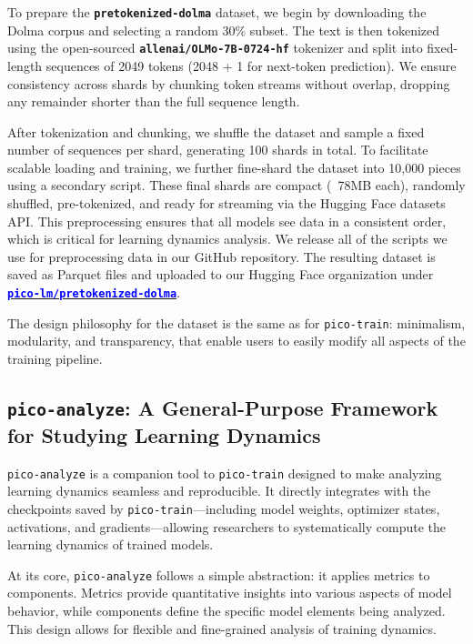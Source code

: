 To prepare the \textbf{\texttt{pretokenized-dolma}} dataset, we begin by downloading the Dolma corpus and selecting a random 30\% subset. The text is then tokenized using the open-sourced \textbf{\texttt{allenai/OLMo-7B-0724-hf}} tokenizer and split into fixed-length sequences of 2049 tokens (2048 + 1 for next-token prediction). We ensure consistency across shards by chunking token streams without overlap, dropping any remainder shorter than the full sequence length.

After tokenization and chunking, we shuffle the dataset and sample a fixed number of sequences per shard, generating 100 shards in total. To facilitate scalable loading and training, we further fine-shard the dataset into 10,000 pieces using a secondary script. These final shards are compact (~78MB each), randomly shuffled, pre-tokenized, and ready for streaming via the Hugging Face datasets API. This preprocessing ensures that all models see data in a consistent order, which is critical for learning dynamics analysis. We release all of the scripts we use for preprocessing data in our GitHub repository. The resulting dataset is saved as Parquet files and uploaded to our Hugging Face organization under \href{https://huggingface.co/datasets/pico-lm/pretokenized-dolma}{\textcolor{blue}{\textbf{\texttt{pico-lm/pretokenized-dolma}}}}.

The design philosophy for the dataset is the same as for \texttt{pico-train}: minimalism, modularity, and transparency, that enable users to easily modify all aspects of the training pipeline. 

\subsection{\texttt{pico-analyze}: A General-Purpose Framework for Studying Learning Dynamics}

\texttt{pico-analyze} is a companion tool to \texttt{pico-train} designed to make analyzing learning dynamics seamless and reproducible. It directly integrates with the checkpoints saved by \texttt{pico-train}—including model weights, optimizer states, activations, and gradients—allowing researchers to systematically compute the learning dynamics of trained models.

At its core, \texttt{pico-analyze} follows a simple abstraction: it applies metrics to components. Metrics provide quantitative insights into various aspects of model behavior, while components define the specific model elements being analyzed. This design allows for flexible and fine-grained analysis of training dynamics.

